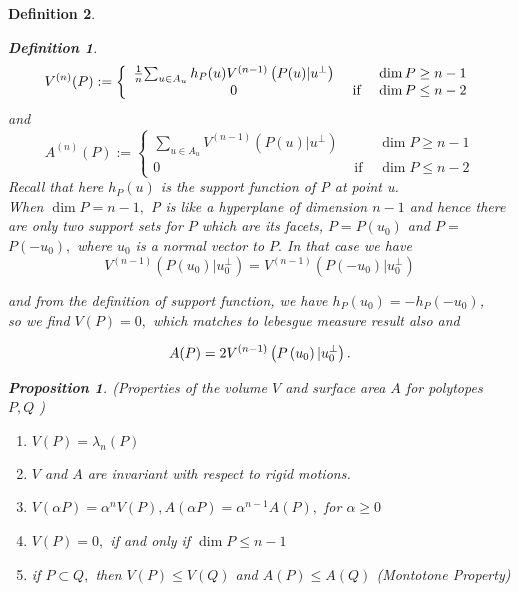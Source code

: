 \documentclass[oneside]{book}
\newtheorem{mydef}{Definition}
\newtheorem{prop}{Proposition}
\begin{document}
\begin{mydef}
\begin{mydef}
\begin{equation}
\label{eq43}
V^{(n)}(P):=\left\{\begin{array}{ccc}
\frac{1}{n} $$ \sum_{u \in A_{u}} h_{P}(u) V^{(n-1)}\left(P(u) | u^{\perp}\right) & & \operatorname{dim} P \geq n-1 \\
0 & \text { if } & \operatorname{dim} P \leq n-2
\end{array}\right.
\end{equation}
and
\begin{equation}
\label{eq44}
A^{(n)}(P):=\left\{\begin{array}{ccc}
\sum_{u \in A_{u}} V^{(n-1)}\left(P(u) | u^{\perp}\right) & & \operatorname{dim} P \geq n-1 \\
0 & \text { if } & \operatorname{dim} P \leq n-2
\end{array}\right.
\end{equation}
Recall that here $h_{P}(u)$ is the support function of P at point u. \\
 When $\operatorname{dim} P=n-1, $ P is like a hyperplane of dimension $n - 1$  and hence there are only two support sets for $P$ which are its facets, $P=P\left(u_{0}\right)$ and $P=$ $P\left(-u_{0}\right),$ where $u_{0}$ is a normal vector to $P .$ In that case we have $$V^{(n-1)}\left(P\left(u_{0}\right) | u_{0}^{\perp}\right)=V^{(n-1)}\left(P\left(-u_{0}\right) | u_{0}^{\perp}\right)$$

and from the  definition of support function, we have $h_{P}\left(u_{0}\right)=-h_{P}\left(-u_{0}\right)$,\\ so we find $V(P)=0,$ which matches to lebesgue measure result also  and 
 
 \begin{equation}
 \label{eq45}
 A(P)=2 V^{(n-1)}\left(P\left(u_{0}\right) | u_{0}^{\perp}\right).\\\\
\end{equation}
\end{mydef} 
\begin{prop} \label{prop:1}
(Properties of the volume $V$ and surface area $A$ for polytopes $P, Q$ )
 \begin{enumerate}
 \item  $V(P)=\lambda_{n}(P)$
 \item  $V$ and $A$ are invariant with respect to rigid motions.
 \item $V(\alpha P)=\alpha^{n} V(P), A(\alpha P)=\alpha^{n-1} A(P),$ for $\alpha \geq 0$
 \item $V(P)=0,$ if and only if $\operatorname{dim} P \leq n-1$
 \item  if $P \subset Q,$ then $V(P) \leq V(Q)$ and $A(P) \leq A(Q)$    (Montotone Property)   \label{prop:5}
 \end{enumerate}
  \end{prop}
 

\end{mydef}
\end{document}
